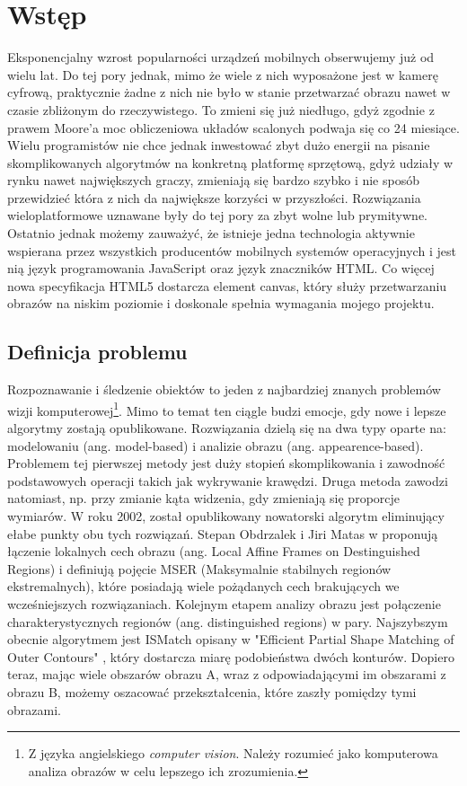 \chapter{Wstęp}

Eksponencjalny wzrost popularności urządzeń mobilnych obserwujemy już od wielu
lat.  Do tej pory jednak, mimo że wiele z nich wyposażone jest w kamerę
cyfrową, praktycznie żadne z nich nie było w stanie przetwarzać obrazu nawet w
czasie zbliżonym do rzeczywistego. To zmieni się już niedługo, gdyż zgodnie z
prawem Moore'a moc obliczeniowa układów scalonych podwaja się co 24 miesiące.
Wielu programistów nie chce jednak inwestować zbyt dużo energii na pisanie
skomplikowanych algorytmów na konkretną platformę sprzętową, gdyż udziały w
rynku nawet największych graczy, zmieniają się bardzo szybko i nie sposób
przewidzieć która z nich da największe korzyści w przyszłości. Rozwiązania
wieloplatformowe uznawane były do tej pory za zbyt wolne lub prymitywne.
Ostatnio jednak możemy zauważyć, że istnieje jedna technologia aktywnie
wspierana przez wszystkich producentów mobilnych systemów operacyjnych i jest
nią język programowania JavaScript oraz język znaczników HTML. Co więcej nowa
specyfikacja HTML5 dostarcza element canvas, który służy przetwarzaniu obrazów
na niskim poziomie i doskonale spełnia wymagania mojego projektu.

\section{Definicja problemu}

Rozpoznawanie i śledzenie obiektów to jeden z najbardziej znanych problemów
wizji komputerowej\footnote{Z języka angielskiego \textit{computer vision}.
Należy rozumieć jako komputerowa analiza obrazów w celu lepszego ich
zrozumienia.}. Mimo to temat ten ciągle budzi emocje, gdy nowe i lepsze
algorytmy zostają opublikowane. Rozwiązania dzielą się na dwa typy oparte na:
modelowaniu (ang. model-based) i analizie obrazu (ang. appearence-based).
Problemem tej pierwszej metody jest duży stopień skomplikowania i zawodność
podstawowych operacji takich jak wykrywanie krawędzi. Druga metoda zawodzi
natomiast, np.  przy zmianie kąta widzenia, gdy zmieniają się proporcje
wymiarów.  W roku 2002, został opublikowany nowatorski algorytm eliminujący
ełabe punkty obu tych rozwiązań. Stepan Obdrzalek i Jiri Matas w \cite{matas02}
proponują łączenie lokalnych cech obrazu (ang. Local Affine Frames on
Destinguished Regions) i definiują pojęcie MSER (Maksymalnie stabilnych
regionów ekstremalnych), które posiadają wiele pożądanych cech brakujących we
wcześniejszych rozwiązaniach.  Kolejnym etapem analizy obrazu jest połączenie
charakterystycznych regionów (ang. distinguished regions) w pary. Najszybszym
obecnie algorytmem jest ISMatch opisany w "Efficient Partial Shape Matching of
Outer Contours" \cite{ismatch}, który dostarcza miarę podobieństwa dwóch
konturów. Dopiero teraz, mając wiele obszarów obrazu A, wraz z odpowiadającymi
im obszarami z obrazu B, możemy oszacować przekształcenia, które zaszły
pomiędzy tymi obrazami.

